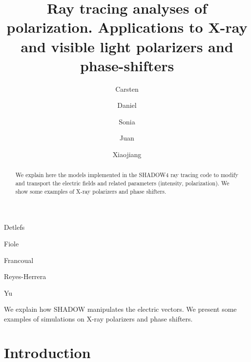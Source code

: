 \documentclass{iucr}
\begin{document}

\title{Ray tracing analyses of polarization. Applications to X-ray and visible light polarizers and phase-shifters}

\author[1]{{Carsten}}{{Detlefs}}
\author[1]{{Daniel}}{{Fiole}}
\author[2]{{Sonia}}{{Francoual}}
\author[1,3]{{Juan}}{{Reyes-Herrera}}
\author[4]{{Xiaojiang}}{{Yu}}



\maketitle   %


\begin{synopsis}
We explain how SHADOW manipulates the electric vectors. We present some examples of simulations on X-ray polarizers and phase shifters. 
\end{synopsis}


\begin{abstract}
We explain here the models implemented in the SHADOW4 ray tracing code to modify and transport the electric fields and related parameters (intensity, polarization). We show some examples of X-ray polarizers and phase shifters.
\end{abstract}

\section{Introduction}\label{sec:introduction}
\end{document}
